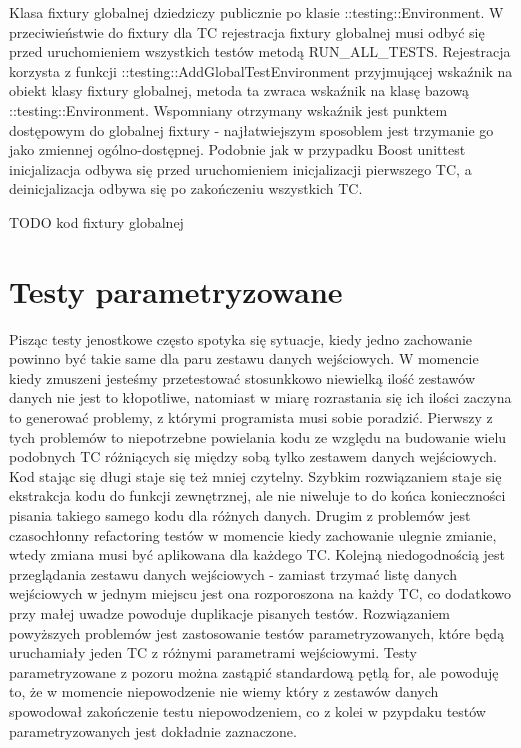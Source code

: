 \documentclass[12pt,a4paper,notitlepage]{report}
\begin{document}
Klasa fixtury globalnej dziedziczy publicznie po klasie ::testing::Environment. W przeciwieństwie do fixtury dla TC rejestracja fixtury globalnej musi odbyć się przed uruchomieniem wszystkich testów metodą RUN_ALL_TESTS.
Rejestracja korzysta z funkcji ::testing::AddGlobalTestEnvironment przyjmującej wskaźnik na obiekt klasy fixtury globalnej, metoda ta zwraca wskaźnik na klasę bazową ::testing::Environment. 
Wspomniany otrzymany wskaźnik jest punktem dostępowym do globalnej fixtury - najłatwiejszym sposoblem jest trzymanie go jako zmiennej ogólno-dostępnej.
Podobnie jak w przypadku Boost unittest inicjalizacja odbywa się przed uruchomieniem inicjalizacji pierwszego TC, a deinicjalizacja odbywa się po zakończeniu wszystkich TC.

TODO kod fixtury globalnej

\chapter{Testy parametryzowane}

Pisząc testy jenostkowe często spotyka się sytuacje, kiedy jedno zachowanie powinno być takie same dla paru zestawu danych wejściowych. W momencie kiedy zmuszeni jesteśmy przetestować stosunkkowo niewielką ilość zestawów danych nie jest to kłopotliwe, natomiast w miarę rozrastania się ich ilości zaczyna to generować problemy, z którymi programista musi sobie poradzić.
Pierwszy z tych problemów to niepotrzebne powielania kodu ze względu na budowanie wielu podobnych TC różniących się między sobą tylko zestawem danych wejściowych. Kod stając się długi staje się też mniej czytelny.
Szybkim rozwiązaniem staje się ekstrakcja kodu do funkcji zewnętrznej, ale nie niweluje to do końca konieczności pisania takiego samego kodu dla różnych danych.
Drugim z problemów jest czasochłonny refactoring testów w momencie kiedy zachowanie ulegnie zmianie, wtedy zmiana musi być aplikowana dla każdego TC.
Kolejną niedogodnością jest przeglądania zestawu danych wejściowych - zamiast trzymać listę danych wejściowych w jednym miejscu jest ona rozporoszona na każdy TC, co dodatkowo przy małej uwadze powoduje duplikacje pisanych testów.
Rozwiązaniem powyższych problemów jest zastosowanie testów parametryzowanych, które będą uruchamiały jeden TC z różnymi parametrami wejściowymi. 
Testy parametryzowane z pozoru można zastąpić standardową pętlą for, ale powoduję to, że w momencie niepowodzenie nie wiemy który z zestawów danych spowodował zakończenie testu niepowodzeniem, co z kolei w pzypdaku testów parametryzowanych jest dokładnie zaznaczone.
\end{document}
